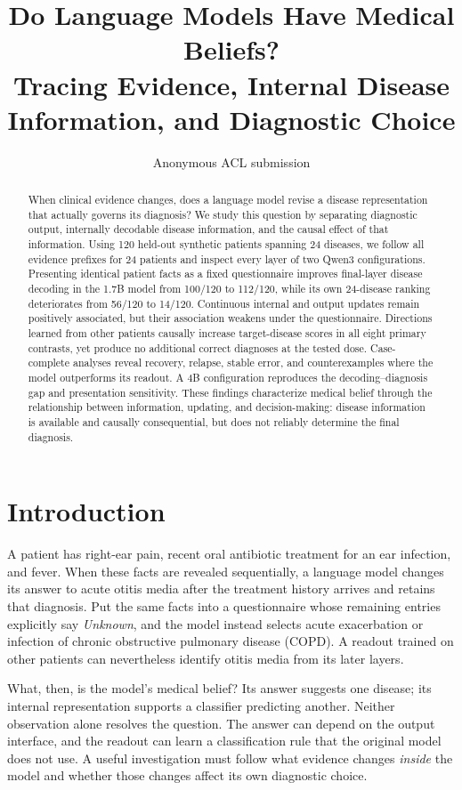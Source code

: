 \documentclass[11pt]{article}
\title{Do Language Models Have Medical Beliefs?\\Tracing Evidence, Internal Disease Information, and Diagnostic Choice}
\author{Anonymous ACL submission}
\begin{document}
\maketitle
\begin{abstract}
When clinical evidence changes, does a language model revise a disease representation that actually governs its diagnosis? We study this question by separating diagnostic output, internally decodable disease information, and the causal effect of that information. Using 120 held-out synthetic patients spanning 24 diseases, we follow all evidence prefixes for 24 patients and inspect every layer of two Qwen3 configurations. Presenting identical patient facts as a fixed questionnaire improves final-layer disease decoding in the 1.7B model from 100/120 to 112/120, while its own 24-disease ranking deteriorates from 56/120 to 14/120. Continuous internal and output updates remain positively associated, but their association weakens under the questionnaire. Directions learned from other patients causally increase target-disease scores in all eight primary contrasts, yet produce no additional correct diagnoses at the tested dose. Case-complete analyses reveal recovery, relapse, stable error, and counterexamples where the model outperforms its readout. A 4B configuration reproduces the decoding--diagnosis gap and presentation sensitivity. These findings characterize medical belief through the relationship between information, updating, and decision-making: disease information is available and causally consequential, but does not reliably determine the final diagnosis.
\end{abstract}

\section{Introduction}
A patient has right-ear pain, recent oral antibiotic treatment for an ear infection, and fever. When these facts are revealed sequentially, a language model changes its answer to acute otitis media after the treatment history arrives and retains that diagnosis. Put the same facts into a questionnaire whose remaining entries explicitly say \emph{Unknown}, and the model instead selects acute exacerbation or infection of chronic obstructive pulmonary disease (COPD). A readout trained on other patients can nevertheless identify otitis media from its later layers.

What, then, is the model's medical belief? Its answer suggests one disease; its internal representation supports a classifier predicting another. Neither observation alone resolves the question. The answer can depend on the output interface, and the readout can learn a classification rule that the original model does not use. A useful investigation must follow what evidence changes \emph{inside} the model and whether those changes affect its own diagnostic choice.
\end{document}
